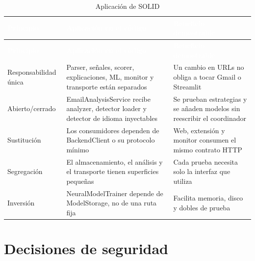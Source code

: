 \documentclass[11pt,a4paper]{article}
\begin{document}
\begingroup
  \small
  \begin{xltabular}{\textwidth}{|>{\raggedright\arraybackslash}p{2.75cm}|X|X|}
  \caption{Aplicación de SOLID}\label{tab:comparativa-3}\\
    \hline
    \textcolor{white}{\textbf{Principio}} & \textcolor{white}{\textbf{Aplicación en el código}} & \textcolor{white}{\textbf{Beneficio demostrable}} \\
    \hline
    \endfirsthead
    \hline
    \textcolor{white}{\textbf{Principio}} & \textcolor{white}{\textbf{Aplicación en el código}} & \textcolor{white}{\textbf{Beneficio demostrable}} \\
    \hline
    \endhead
    Responsabilidad única & Parser, señales, scorer, explicaciones, ML, monitor y transporte están separados & Un cambio en URLs no obliga a tocar Gmail o Streamlit \\
    \hline
    Abierto/\allowbreak{}cerrado & EmailAnalysisService recibe analyzer, detector loader y detector de idioma inyectables & Se prueban estrategias y se añaden modelos sin reescribir el coordinador \\
    \hline
    Sustitución & Los consumidores dependen de BackendClient o su protocolo mínimo & Web, extensión y monitor consumen el mismo contrato HTTP \\
    \hline
    Segregación & El almacenamiento, el análisis y el transporte tienen superficies pequeñas & Cada prueba necesita solo la interfaz que utiliza \\
    \hline
    Inversión & NeuralModelTrainer depende de ModelStorage, no de una ruta fija & Facilita memoria, disco y dobles de prueba \\
    \hline
  \end{xltabular}
\endgroup

\section{Decisiones de seguridad}
\end{document}
